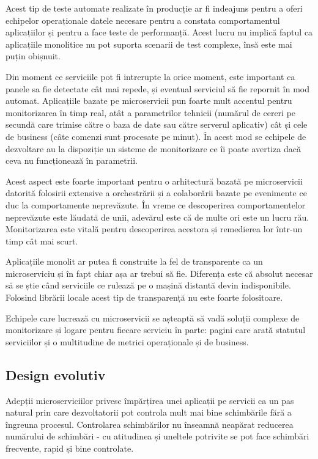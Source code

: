 \documentclass[12pt, a4paper, oneside, romanian]{teza-upb}
\begin{document}
Acest tip de teste automate realizate în producție ar fi indeajuns pentru a oferi echipelor operaționale datele necesare pentru a constata comportamentul aplicațiilor și pentru a face teste de performanță. Acest lucru nu implică faptul ca aplicațiile monolitice nu pot suporta scenarii de test complexe, însă este mai puțin obișnuit. 

Din moment ce serviciile pot fi intrerupte la orice moment, este important ca panele sa fie detectate cât mai repede, și eventual serviciul să fie repornit în mod automat. Aplicațiile bazate pe microservicii pun foarte mult accentul pentru monitorizarea în timp real, atât a parametrilor tehnicii (numărul de cereri pe secundă care trimise către o baza de date sau către serverul aplicativ) cât și cele de business (câte comenzi sunt procesate pe minut). În acest mod se echipele de dezvoltare au la dispoziție un sisteme de monitorizare ce îi poate avertiza dacă ceva nu funcționează în parametrii. 

Acest aspect este foarte important pentru o arhitectură bazată pe microservicii datorită folosirii extensive a orchestrării și a colaborării bazate pe evenimente ce duc la comportamente neprevăzute. În vreme ce descoperirea comportamentelor neprevăzute este lăudată de unii, adevărul este că de multe ori este un lucru rău. Monitorizarea este vitală pentru descoperirea acestora și remedierea lor într-un timp cât mai scurt. 

Aplicațiile monolit ar putea fi construite la fel de transparente ca un microserviciu și în fapt chiar așa ar trebui să fie. Diferența este că absolut necesar să se știe când serviciile ce rulează pe o mașină distantă devin indisponibile. Folosind librării locale acest tip de transparență nu este foarte folositoare. 

Echipele care lucrează cu microservicii se așteaptă să vadă soluții complexe de monitorizare și logare pentru fiecare serviciu în parte: pagini care arată statutul serviciilor și o multitudine de metrici operaționale și de business. 

\subsection{Design evolutiv}

Adepții microserviciilor privesc împărțirea unei aplicații pe servicii ca un pas natural prin care dezvoltatorii pot controla mult mai bine schimbările fără a îngreuna procesul. Controlarea schimbărilor nu înseamnă neapărat reducerea numărului de schimbări - cu atitudinea și uneltele potrivite se pot face schimbări frecvente, rapid și bine controlate. 
\end{document}
